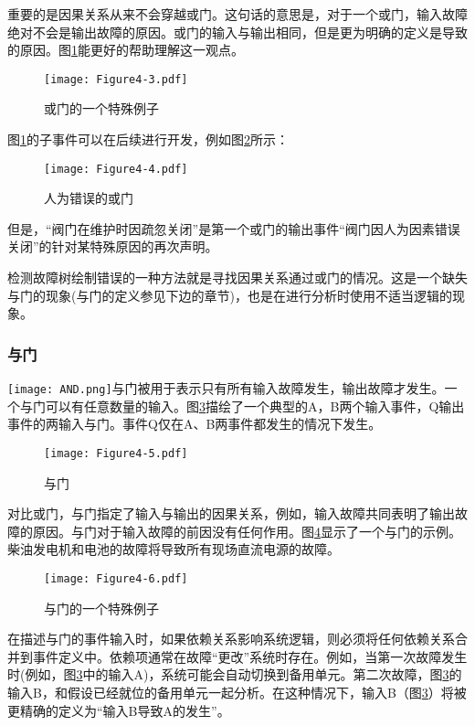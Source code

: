 \documentclass[cn,11pt,chinese]{elegantbook}
\begin{document}
重要的是因果关系从来不会穿越或门。这句话的意思是，对于一个或门，输入故障绝对不会是输出故障的原因。或门的输入与输出相同，但是更为明确的定义是导致的原因。图\ref{fig:fig4_3}能更好的帮助理解这一观点。

\begin{figure}[htpb]
	\centering
	\texttt{[image: Figure4-3.pdf]}
	\caption{或门的一个特殊例子}\label{fig:fig4_3}
\end{figure}

图\ref{fig:fig4_3}的子事件可以在后续进行开发，例如图\ref{fig:fig4_4}所示：

\begin{figure}[h]
	\centering
	\texttt{[image: Figure4-4.pdf]}
	\caption{人为错误的或门}\label{fig:fig4_4}
\end{figure}

但是，“阀门在维护时因疏忽关闭”是第一个或门的输出事件“阀门因人为因素错误关闭”的针对某特殊原因的再次声明。


检测故障树绘制错误的一种方法就是寻找因果关系通过或门的情况。这是一个缺失与门的现象(与门的定义参见下边的章节)，也是在进行分析时使用不适当逻辑的现象。

\subsubsection{与门}

\texttt{[image: AND.png]}与门被用于表示只有所有输入故障发生，输出故障才发生。一个与门可以有任意数量的输入。图\ref{fig:fig4_5}描绘了一个典型的A，B两个输入事件，Q输出事件的两输入与门。事件Q仅在A、B两事件都发生的情况下发生。

\begin{figure}[h]
	\centering
	\texttt{[image: Figure4-5.pdf]}
	\caption{与门}\label{fig:fig4_5}
\end{figure}

对比或门，与门指定了输入与输出的因果关系，例如，输入故障共同表明了输出故障的原因。与门对于输入故障的前因没有任何作用。图\ref{fig:fig4_6}显示了一个与门的示例。柴油发电机和电池的故障将导致所有现场直流电源的故障。

\begin{figure}[h]
	\centering
	\texttt{[image: Figure4-6.pdf]}
	\caption{与门的一个特殊例子}\label{fig:fig4_6}
\end{figure}

在描述与门的事件输入时，如果依赖关系影响系统逻辑，则必须将任何依赖关系合并到事件定义中。依赖项通常在故障“更改”系统时存在。例如，当第一次故障发生时(例如，图\ref{fig:fig4_5}中的输入A)，系统可能会自动切换到备用单元。第二次故障，图\ref{fig:fig4_5}的输入B，和假设已经就位的备用单元一起分析。在这种情况下，输入B（图\ref{fig:fig4_5}）将被更精确的定义为“输入B导致A的发生”。
\end{document}
